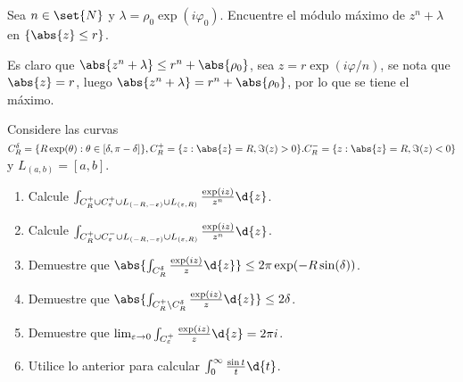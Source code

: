 \documentclass{homework}
\begin{document}
\begin{prob}
    Sea \(n\in\set{N}\) y \(\lambda=\rho_0\exp(i\varphi_0)\). Encuentre el módulo máximo de \(z^n+\lambda\) en \(\{\abs{z}\leq r\}\).
\end{prob}

\begin{sol}
    Es claro que \(\abs{z^n+\lambda}\leq r^n+\abs{\rho_0}\), sea \(z=r\exp(i\varphi/n)\), se nota que \(\abs{z}=r\), luego \(\abs{z^n+\lambda}=r^n+\abs{\rho_0}\), por lo que se tiene el máximo.
\end{sol}

\begin{prob}
    Considere las curvas \(C_R^\delta=\{R\exp(\theta):\theta\in[\delta,\pi-\delta]\},C_R^+=\{z:\abs{z}=R,\Im(z)>0\}.C_R^-=\{z:\abs{z}=R,\Im(z)<0\}\) y \(L_{(a,b)}=[a,b]\).
    \begin{enumerate}[label=(\alph*)]
        \item Calcule \(\int_{C_R^+\cup C_\varepsilon^+\cup L_{(-R,-\varepsilon)}\cup L_{(\varepsilon,R)}}\frac{\exp(iz)}{z^n}\d{z}\).
        \item Calcule \(\int_{C_R^+\cup C_\varepsilon^-\cup L_{(-R,-\varepsilon)}\cup L_{(\varepsilon,R)}}\frac{\exp(iz)}{z^n}\d{z}\).
        \item Demuestre que \(\abs{\int_{C_R^\delta}\frac{\exp(iz)}z\d{z}}\leq2\pi\exp(-R\sin(\delta))\).
        \item Demuestre que \(\abs{\int_{C_R^+\setminus C_R^\delta}\frac{\exp(iz)}z\d{z}}\leq2\delta\).
        \item Demuestre que \(\lim_{\varepsilon\rightarrow0}\int_{C_\varepsilon^+}\frac{\exp(iz)}z\d{z}=2\pi i\).
        \item Utilice lo anterior para calcular \(\int_0^\infty\frac{\sin t}t\d{t}\).
    \end{enumerate}
\end{prob}
\end{document}
